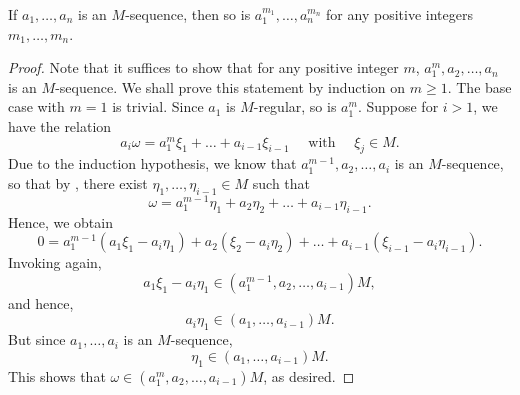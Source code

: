 \begin{theorem}
    If $a_1,\dots,a_n$ is an $M$-sequence, then so is $a_1^{m_1},\dots,a_n^{m_n}$ for any positive integers $m_1,\dots,m_n$.
\end{theorem}
\begin{proof}
    Note that it suffices to show that for any positive integer $m$, $a_1^m, a_2,\dots, a_n$ is an $M$-sequence. We shall prove this statement by induction on $m\ge 1$. The base case with $m = 1$ is trivial. Since $a_1$ is $M$-regular, so is $a_1^m$. Suppose for $i > 1$, we have the relation 
    \begin{equation*}
        a_i\omega = a_1^m\xi_1 + \dots + a_{i - 1}\xi_{i - 1}\quad\text{ with }\quad \xi_j\in M.
    \end{equation*}
    Due to the induction hypothesis, we know that $a_1^{m - 1}, a_2,\dots,a_i$ is an $M$-sequence, so that by , there exist $\eta_1,\dots,\eta_{i - 1}\in M$ such that 
    \begin{equation*}
        \omega = a_1^{m - 1}\eta_1 + a_2\eta_2 + \dots + a_{i - 1}\eta_{i - 1}.
    \end{equation*}
    Hence, we obtain 
    \begin{equation*}
        0 = a_1^{m - 1}(a_1\xi_1 - a_i\eta_1) + a_2(\xi_2 - a_i\eta_2) + \dots + a_{i - 1}(\xi_{i - 1} - a_i\eta_{i - 1}).
    \end{equation*}
    Invoking  again, 
    \begin{equation*}
        a_1\xi_1 - a_i\eta_1\in(a_1^{m - 1}, a_2,\dots,a_{i - 1})M,
    \end{equation*}
    and hence, 
    \begin{equation*}
        a_i\eta_1\in(a_1, \dots, a_{i - 1})M.
    \end{equation*}
    But since $a_1,\dots,a_i$ is an $M$-sequence, 
    \begin{equation*}
        \eta_1\in (a_1,\dots,a_{i - 1})M.
    \end{equation*}
    This shows that $\omega\in (a_1^m, a_2,\dots,a_{i - 1})M$, as desired.
\end{proof}

